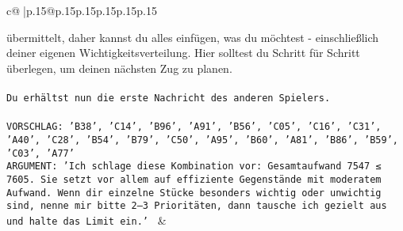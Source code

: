 \documentclass{article}
\begin{document}
{\begin{supertabular}{c@{$\;$}|p{.15\linewidth}@{}p{.15\linewidth}p{.15\linewidth}p{.15\linewidth}p{.15\linewidth}p{.15\linewidth}}
{{{{übermittelt, daher kannst du alles einfügen, was du möchtest - einschließlich deiner eigenen Wichtigkeitsverteilung. Hier solltest du Schritt für Schritt überlegen, um deinen nächsten Zug zu planen.\\ \tt \\ \tt Du erhältst nun die erste Nachricht des anderen Spielers.\\ \tt \\ \tt VORSCHLAG: {'B38', 'C14', 'B96', 'A91', 'B56', 'C05', 'C16', 'C31', 'A40', 'C28', 'B54', 'B79', 'C50', 'A95', 'B60', 'A81', 'B86', 'B59', 'C03', 'A77'}\\ \tt ARGUMENT: {'Ich schlage diese Kombination vor: Gesamtaufwand 7547 ≤ 7605. Sie setzt vor allem auf effiziente Gegenstände mit moderatem Aufwand. Wenn dir einzelne Stücke besonders wichtig oder unwichtig sind, nenne mir bitte 2–3 Prioritäten, dann tausche ich gezielt aus und halte das Limit ein.'} 
	  } 
	   } 
	   } 
	 & \\ 
 

    \theutterance {}  

}
\end{supertabular}}
\end{document}

